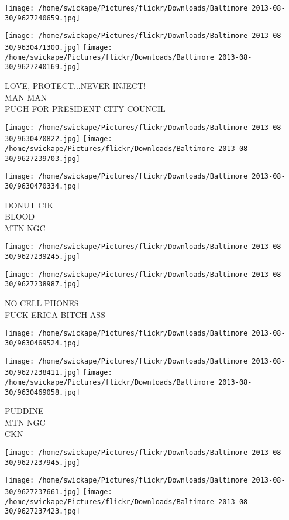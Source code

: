 \documentclass[10pt,letterpaper]{article}
\begin{document}
\texttt{[image: /home/swickape/Pictures/flickr/Downloads/Baltimore 2013-08-30/9627240659.jpg]}

\vspace{0.25in}
\texttt{[image: /home/swickape/Pictures/flickr/Downloads/Baltimore 2013-08-30/9630471300.jpg]}
\texttt{[image: /home/swickape/Pictures/flickr/Downloads/Baltimore 2013-08-30/9627240169.jpg]}

LOVE, PROTECT...NEVER INJECT!\\
MAN MAN\\
PUGH FOR PRESIDENT CITY COUNCIL
\pagebreak

\texttt{[image: /home/swickape/Pictures/flickr/Downloads/Baltimore 2013-08-30/9630470822.jpg]}
\texttt{[image: /home/swickape/Pictures/flickr/Downloads/Baltimore 2013-08-30/9627239703.jpg]}

\texttt{[image: /home/swickape/Pictures/flickr/Downloads/Baltimore 2013-08-30/9630470334.jpg]}

DONUT CIK\\
BLOOD\\
MTN NGC
\pagebreak

\texttt{[image: /home/swickape/Pictures/flickr/Downloads/Baltimore 2013-08-30/9627239245.jpg]}

\vspace{0.25in}
\texttt{[image: /home/swickape/Pictures/flickr/Downloads/Baltimore 2013-08-30/9627238987.jpg]}

NO CELL PHONES\\
FUCK ERICA BITCH ASS
\pagebreak

\texttt{[image: /home/swickape/Pictures/flickr/Downloads/Baltimore 2013-08-30/9630469524.jpg]}

\vspace{0.25in}
\texttt{[image: /home/swickape/Pictures/flickr/Downloads/Baltimore 2013-08-30/9627238411.jpg]}
\texttt{[image: /home/swickape/Pictures/flickr/Downloads/Baltimore 2013-08-30/9630469058.jpg]}

PUDDINE\\
MTN NGC\\
CKN
\pagebreak

\texttt{[image: /home/swickape/Pictures/flickr/Downloads/Baltimore 2013-08-30/9627237945.jpg]}

\vspace{0.25in}
\texttt{[image: /home/swickape/Pictures/flickr/Downloads/Baltimore 2013-08-30/9627237661.jpg]}
\texttt{[image: /home/swickape/Pictures/flickr/Downloads/Baltimore 2013-08-30/9627237423.jpg]}
\end{document}
